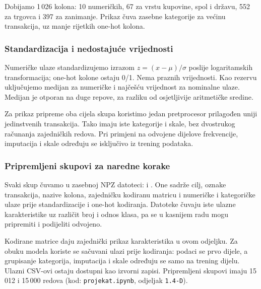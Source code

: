 Dobijamo 1\,026 kolona: 10 numeričkih, 67 za vrstu kupovine, spol i državu,
552 za trgovca i 397 za zanimanje. Prikaz čuva zasebne kategorije za većinu
transakcija, uz manje rijetkih one-hot kolona.

\subsubsection*{Standardizacija i nedostajuće vrijednosti}
Numeričke ulaze standardizujemo izrazom $z=(x-\mu)/\sigma$ poslije logaritamskih
transformacija; one-hot kolone ostaju 0/1. Nema praznih vrijednosti. Kao rezervu
uključujemo medijan za numeričke i najčešću vrijednost za nominalne ulaze.
Medijan je otporan na duge repove, za razliku od osjetljivije aritmetičke sredine.

Za prikaz pripreme oba cijela skupa koristimo jedan pretprocesor prilagođen
uniji jedinstvenih transakcija. Tako imaju iste kategorije i skale, bez
dvostrukog računanja zajedničkih redova. Pri primjeni na odvojene dijelove
frekvencije, imputacija i skale određuju se isključivo iz trening podataka.

\subsubsection*{Pripremljeni skupovi za naredne korake}
Svaki skup čuvamo u zasebnoj NPZ datoteci: 
i . One sadrže cilj, oznake transakcija, nazive kolona,
zajedničku kodiranu matricu i numeričke i kategoričke ulaze prije standardizacije
i one-hot kodiranja. Datoteke čuvaju iste ulazne karakteristike uz različit broj
i odnos klasa, pa se u kasnijem radu mogu pripremiti i podijeliti odvojeno.

Kodirane matrice daju zajednički prikaz karakteristika u ovom odjeljku. Za obuku
modela koriste se sačuvani ulazi prije kodiranja: podaci se prvo dijele, a grupisanje
kategorija, imputacija i skale određuju se samo na trening dijelu. Ulazni CSV-ovi
ostaju dostupni kao izvorni zapisi. Pripremljeni skupovi imaju 15\,012 i
15\,000 redova (kod: \texttt{projekat.ipynb}, odjeljak \texttt{1.4-D}).
